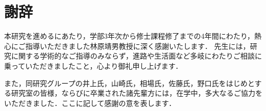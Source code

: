 \chapter*{謝辞}

本研究を進めるにあたり，学部3年次から修士課程修了までの4年間にわたり，熱心にご指導いただきました林原靖男教授に深く感謝いたします．
先生には，研究に関する学術的なご指導のみならず，進路や生活面など多岐にわたりご相談に乗っていただきましたこと，心より御礼申し上げます．

また，同研究グループの井上氏，山崎氏，相場氏，佐藤氏，野口氏をはじめとする研究室の皆様，ならびに卒業された諸先輩方には，在学中，多大なるご協力をいただきました．ここに記して感謝の意を表します．
%
